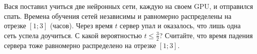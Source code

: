 \documentclass{article}
\begin{document}
Вася поставил учиться две нейронных сети, каждую на своем GPU, и отправился спать. Времена обучения сетей независимы и равномерно
распределены на отрезке $[1;3]$ (часов). Через время $t$ сервер упал и оказалось, что лишь одна сеть успела доучиться.
С какой вероятностью $t \leqslant \frac32$? Считайте, что время падения сервера тоже равномерно распределено на отрезке $[1;3]$.
\end{document}
